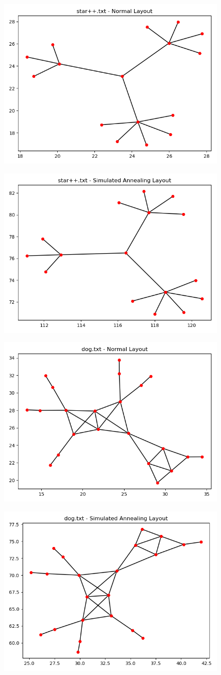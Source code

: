 \documentclass[10pt,a4paper]{article}
\begin{document}
\begin{enumerate}
\begin{figure}[H]
	\centering
	\includegraphics[width=0.5\linewidth]{../Scripts/star++_normal}
	\caption{}
	\label{fig:starpnormal}
\end{figure}

\begin{figure}[H]
	\centering
	\includegraphics[width=0.5\linewidth]{../Scripts/star++_annealing}
	\caption{}
	\label{fig:starpannealing}
\end{figure}

\begin{figure}[H]
	\centering
	\includegraphics[width=0.5\linewidth]{../Scripts/dog_normal}
	\caption{}
	\label{fig:dgnormal}
\end{figure}

\begin{figure}[H]
	\centering
	\includegraphics[width=0.5\linewidth]{../Scripts/dog_annealing}
	\caption{}
	\label{fig:dgannealing}
\end{figure}



\end{enumerate}
\end{document}
